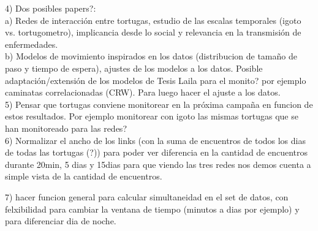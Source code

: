 \documentclass[12pt,screen,twoside,pagebackref]{ibtesis}
\begin{document}
4) Dos posibles papers?: \\
    a) Redes de interacción entre tortugas, estudio de las escalas temporales (igoto vs. tortugometro), 
    implicancia desde lo social y relevancia en la transmisión de enfermedades.\\
    b) Modelos de movimiento inspirados en los datos (distribucion de tamaño de paso y tiempo de espera), 
    ajustes de los modelos a los datos. Posible adaptación/extensión de los modelos de Tesis Laila para el monito? 
    por ejemplo caminatas correlacionadas (CRW). Para luego hacer el ajuste a los datos.\\

5) Pensar que tortugas conviene monitorear en la próxima campaña en funcion de estos resultados. Por ejemplo
monitorear con igoto las mismas tortugas que se han monitoreado para las redes?\\

6) Normalizar el ancho de los links (con la suma de encuentros de todos los dias de todas las tortugas (?)) para poder ver diferencia en la cantidad de encuentros durante 20min, 5 dias y 15dias
para que viendo las tres redes nos demos cuenta a simple vista de la cantidad de encuentros.

7) hacer funcion general para calcular simultaneidad en el set de datos, con felxibilidad para cambiar la ventana 
de tiempo (minutos a dias por ejemplo) y para diferenciar dia de noche.


  


    
    
    
\end{document}
